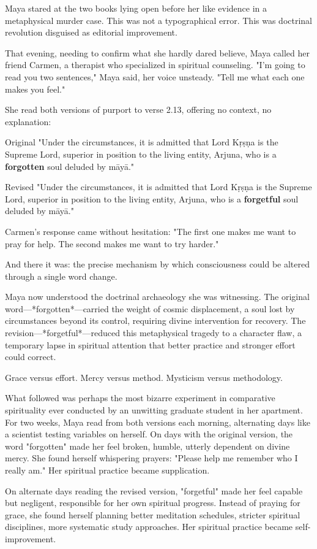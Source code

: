 \documentclass[12pt,twoside]{book}
\begin{document}
Maya stared at the two books lying open before her like evidence in a metaphysical murder case. This was not a typographical error. This was doctrinal revolution disguised as editorial improvement.

That evening, needing to confirm what she hardly dared believe, Maya called her friend Carmen, a therapist who specialized in spiritual counseling. "I'm going to read you two sentences," Maya said, her voice unsteady. "Tell me what each one makes you feel."

She read both versions of purport to verse 2.13, offering no context, no explanation:

Original
"Under the circumstances, it is admitted that Lord Kṛṣṇa is the Supreme Lord, superior in position to the living entity, Arjuna, who is a \textbf{forgotten} soul deluded by māyā."

Revised
"Under the circumstances, it is admitted that Lord Kṛṣṇa is the Supreme Lord, superior in position to the living entity, Arjuna, who is a \textbf{forgetful} soul deluded by māyā."

Carmen's response came without hesitation: "The first one makes me want to pray for help. The second makes me want to try harder."

And there it was: the precise mechanism by which consciousness could be altered through a single word change.

Maya now understood the doctrinal archaeology she was witnessing. The original word—*forgotten*—carried the weight of cosmic displacement, a soul lost by circumstances beyond its control, requiring divine intervention for recovery. The revision—*forgetful*—reduced this metaphysical tragedy to a character flaw, a temporary lapse in spiritual attention that better practice and stronger effort could correct.

Grace versus effort. Mercy versus method. Mysticism versus methodology.

What followed was perhaps the most bizarre experiment in comparative spirituality ever conducted by an unwitting graduate student in her apartment. For two weeks, Maya read from both versions each morning, alternating days like a scientist testing variables on herself. On days with the original version, the word "forgotten" made her feel broken, humble, utterly dependent on divine mercy. She found herself whispering prayers: "Please help me remember who I really am." Her spiritual practice became supplication.

On alternate days reading the revised version, "forgetful" made her feel capable but negligent, responsible for her own spiritual progress. Instead of praying for grace, she found herself planning better meditation schedules, stricter spiritual disciplines, more systematic study approaches. Her spiritual practice became self-improvement.
\end{document}
